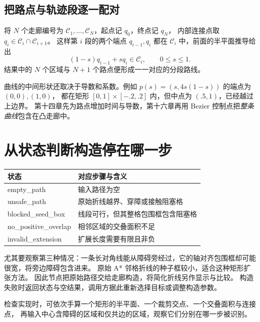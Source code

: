 \subsection{把路点与轨迹段逐一配对}
将 $N$ 个走廊编号为 $\mathcal C_1,\ldots,\mathcal C_N$，起点记 $q_0$，终点记 $q_N$，
内部连接点取 $q_i\in\mathcal C_i\cap\mathcal C_{i+1}$。
这样第 $i$ 段的两个端点 $q_{i-1},q_i$ 都在 $\mathcal C_i$ 中，前面的半平面推导给出
\begin{equation}(1-s)q_{i-1}+s q_i\in\mathcal C_i,\qquad 0\leq s\leq1.\end{equation}
结果中的 $N$ 个区域与 $N+1$ 个路点便形成一一对应的分段路线。

曲线的中间形状还取决于导数和系数。例如 $p(s)=(s,4s(1-s))$ 的端点为 $(0,0),(1,0)$，
都在矩形 $[0,1]\times[-.2,.2]$ 内，但中点为 $(.5,1)$，已经越过上边界。
第十四章先为路点增加时间与导数，第十六章再用 Bezier 控制点把\emph{整条曲线}包含在凸走廊中。

\section{从状态判断构造停在哪一步}
\begin{center}\small
\begin{tabular}{ll}\toprule
状态 & 对应步骤与含义\\\midrule
empty\_path & 输入路径为空\\
unsafe\_path & 原始折线越界、穿障或接触阻塞格\\
blocked\_seed\_box & 线段可行，但其整格包围框包含阻塞格\\
no\_positive\_overlap & 相邻区域的交叠面积不足\\
invalid\_extension & 扩展长度需要有限且非负\\\bottomrule
\end{tabular}
\end{center}
尤其要观察第三种情况：一条长对角线能从障碍旁经过，它的轴对齐包围框却可能很宽，将旁边障碍包含进来。
原始 A* 邻格折线的种子框较小，适合这种矩形扩张方法。
因此节点把原始路径交给走廊构造，将简化折线另作显示与比较。
构造失败时返回状态与空结果，调用方据此重新选择目标或调整构造参数。

检查实现时，可依次手算一个矩形的半平面、一个裁剪交点、一个交叠面积与连接点，
再输入中心含障碍的区域和仅共边的区域，观察它们分别在哪一步被识别。
